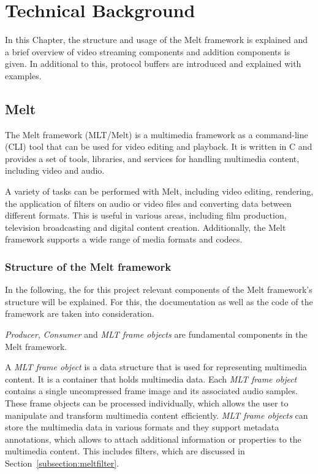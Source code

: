 \documentclass[../MasterThesis.tex]{subfiles}
\begin{document}
	
	

\newpage

\section{Technical Background} \label{section:technicalbackground}


In this Chapter, the structure and usage of the Melt framework is explained and a brief overview of video streaming components and addition components is given. In additional to this, protocol buffers are introduced and explained with examples.


\subsection{Melt} \label{subsection:melt}

The Melt framework (MLT/Melt) is a multimedia framework as a command-line (CLI) tool that can be used for video editing and playback. It is written in C and provides a set of tools, libraries, and services for handling multimedia content, including video and audio.~\cite{melt} 


A variety of tasks can be performed with Melt, including video editing, rendering, the application of filters on audio or video files and converting data between different formats. 
This is useful in various areas, including film production, television broadcasting and digital content creation. 
Additionally, the Melt framework supports a wide range of media formats and codecs.




\subsubsection*{Structure of the Melt framework}


In the following, the for this project relevant components of the Melt framework's structure will be explained. For this, the documentation as well as the code of the framework are taken into consideration.~\cite{melt, melt_code}

\textit{Producer}, \textit{Consumer} and \textit{MLT frame objects} are fundamental components in the Melt framework.

A \textit{MLT frame object} is a data structure that is used for representing multimedia content. 
It is a container that holds multimedia data. Each \textit{MLT frame object} contains a single uncompressed frame image and its associated audio samples. These frame objects can be processed individually, which allows the user to manipulate and transform multimedia content efficiently.
\textit{MLT frame objects} can store the multimedia data in various formats and they support metadata annotations, which allows to attach additional information or properties to the multimedia content. This includes filters, which are discussed in Section~\ref{subsection:meltfilter}.
\end{document}
